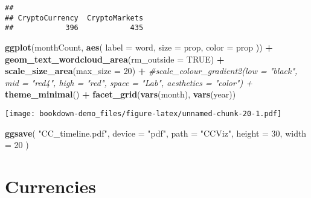 \documentclass[
]{book}
\newenvironment{Shaded}{\begin{snugshade}}{\end{snugshade}}
\newcommand{\CommentTok}[1]{\textcolor[rgb]{0.56,0.35,0.01}{\textit{#1}}}
\newcommand{\DataTypeTok}[1]{\textcolor[rgb]{0.13,0.29,0.53}{#1}}
\newcommand{\DecValTok}[1]{\textcolor[rgb]{0.00,0.00,0.81}{#1}}
\newcommand{\KeywordTok}[1]{\textcolor[rgb]{0.13,0.29,0.53}{\textbf{#1}}}
\newcommand{\NormalTok}[1]{#1}
\newcommand{\OperatorTok}[1]{\textcolor[rgb]{0.81,0.36,0.00}{\textbf{#1}}}
\newcommand{\OtherTok}[1]{\textcolor[rgb]{0.56,0.35,0.01}{#1}}
\newcommand{\StringTok}[1]{\textcolor[rgb]{0.31,0.60,0.02}{#1}}
\begin{document}
\begin{verbatim}
## 
## CryptoCurrency  CryptoMarkets 
##            396            435
\end{verbatim}

\begin{Shaded}
\begin{Highlighting}[]
\KeywordTok{ggplot}\NormalTok{(monthCount, }\KeywordTok{aes}\NormalTok{(}
  \DataTypeTok{label =}\NormalTok{ word,}
  \DataTypeTok{size =}\NormalTok{ prop,}
  \DataTypeTok{color =}\NormalTok{ prop}
\NormalTok{)) }\OperatorTok{+}
\StringTok{  }\KeywordTok{geom_text_wordcloud_area}\NormalTok{(}\DataTypeTok{rm_outside =} \OtherTok{TRUE}\NormalTok{) }\OperatorTok{+}
\StringTok{  }\KeywordTok{scale_size_area}\NormalTok{(}\DataTypeTok{max_size =} \DecValTok{20}\NormalTok{) }\OperatorTok{+}
\StringTok{  }\CommentTok{#scale_colour_gradient2(low = "black", mid = "red4", high = "red", space = "Lab", aesthetics = "color") +}
\StringTok{  }\KeywordTok{theme_minimal}\NormalTok{() }\OperatorTok{+}
\StringTok{  }\KeywordTok{facet_grid}\NormalTok{(}\KeywordTok{vars}\NormalTok{(month), }\KeywordTok{vars}\NormalTok{(year))}
\end{Highlighting}
\end{Shaded}

\texttt{[image: bookdown-demo\_files/figure-latex/unnamed-chunk-20-1.pdf]}

\begin{Shaded}
\begin{Highlighting}[]
\KeywordTok{ggsave}\NormalTok{(}
  \StringTok{"CC_timeline.pdf"}\NormalTok{,}
  \DataTypeTok{device =} \StringTok{"pdf"}\NormalTok{,}
  \DataTypeTok{path =} \StringTok{"CCViz"}\NormalTok{,}
  \DataTypeTok{height =} \DecValTok{30}\NormalTok{,}
  \DataTypeTok{width =} \DecValTok{20}
\NormalTok{)}
\end{Highlighting}
\end{Shaded}

\hypertarget{currencies}{%
\section{Currencies}\label{currencies}}
\end{document}
